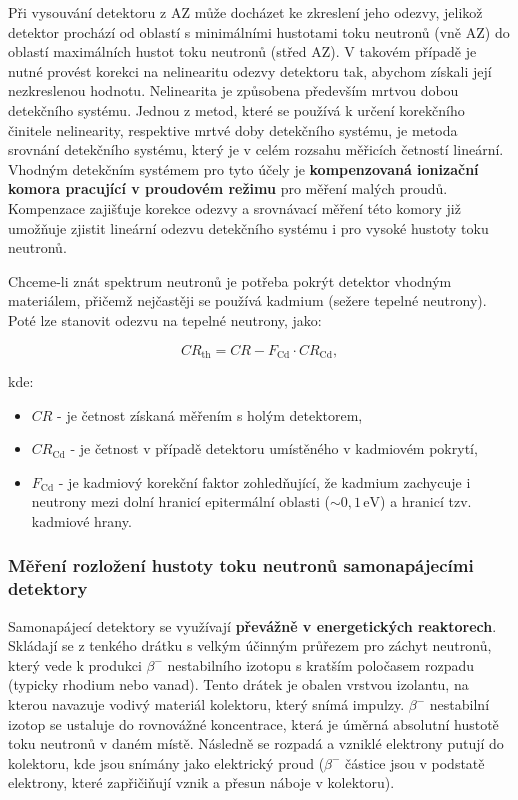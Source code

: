 Při vysouvání detektoru z AZ může docházet ke zkreslení jeho odezvy, jelikož detektor prochází od oblastí s minimálními hustotami toku neutronů (vně AZ) do oblastí maximálních hustot toku neutronů (střed AZ). V takovém případě je nutné provést korekci na nelinearitu odezvy detektoru tak, abychom získali její nezkreslenou hodnotu. Nelinearita je způsobena především mrtvou dobou detekčního systému. Jednou z metod, které se používá k určení korekčního činitele nelinearity, respektive mrtvé doby detekčního systému, je metoda srovnání detekčního systému, který je v celém rozsahu měřicích četností lineární. Vhodným detekčním systémem pro tyto účely je \textbf{kompenzovaná ionizační komora pracující v proudovém režimu} pro měření malých proudů. Kompenzace zajišťuje korekce odezvy a srovnávací měření této komory již umožňuje zjistit lineární odezvu detekčního systému i pro vysoké hustoty toku neutronů.

Chceme-li znát spektrum neutronů je potřeba pokrýt detektor vhodným materiálem, přičemž nejčastěji se používá kadmium (sežere tepelné neutrony). Poté lze stanovit odezvu na tepelné neutrony, jako: 

\begin{equation*}
CR_{\text{th}} = CR - F_{\text{Cd}} \cdot CR_{\text{Cd}}, 
\end{equation*}

kde:
\begin{itemize}
    \item $CR$ - je četnost získaná měřením s holým detektorem,
    \item $CR_{\text{Cd}}$ - je četnost v případě detektoru umístěného v kadmiovém pokrytí,
    \item $F_{\text{Cd}}$ - je kadmiový korekční faktor zohledňující, že kadmium zachycuje i neutrony mezi dolní hranicí epitermální oblasti ($\sim 0,1 \, \text{eV}$) a hranicí tzv. kadmiové hrany.
\end{itemize}


\subsubsection{Měření rozložení hustoty toku neutronů samonapájecími detektory}

Samonapájecí detektory se využívají \textbf{převážně v energetických reaktorech}. Skládají se z tenkého drátku s velkým účinným průřezem pro záchyt neutronů, který vede k produkci $\beta^-$ nestabilního izotopu s kratším poločasem rozpadu (typicky rhodium nebo vanad). Tento drátek je obalen vrstvou izolantu, na kterou navazuje vodivý materiál kolektoru, který snímá impulzy. $\beta^-$ nestabilní izotop se ustaluje do rovnovážné koncentrace, která je úměrná absolutní hustotě toku neutronů v daném místě. Následně se rozpadá a vzniklé elektrony putují do kolektoru, kde jsou snímány jako elektrický proud ($\beta^-$ částice jsou v podstatě elektrony, které zapřičiňují vznik a přesun náboje v kolektoru).

